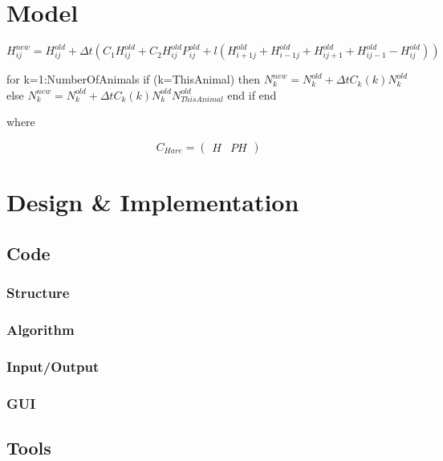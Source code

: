 \documentclass[12pt]{report}
\begin{document}
\chapter{Model} %

$H_{ij}^{new}=H_{ij}^{old} + {\Delta}t(C_{1}H_{ij}^{old}+C_{2}H_{ij}^{old}P_{ij}^{old} + l(H_{i+1j}^{old} + H_{i-1j}^{old} + H_{ij+1}^{old} + H_{ij-1}^{old}-H_{ij}^{old}))$


\vspace{30 mm}

\noindent for k=1:NumberOfAnimals\newline{}
if (k=ThisAnimal) then\newline{}
$N_{k}^{new}=N_{k}^{old} + {\Delta}tC_{k}(k)N_{k}^{old}$\newline{}
else\newline{}
$N_{k}^{new}=N_{k}^{old} + {\Delta}tC_{k}(k)N_{k}^{old}N_{ThisAnimal}^{old}$\newline{}
end if\newline{}
end

where

\[ C_{Hare} = \left( \begin{array}{cc}
H & PH \end{array} \right)\] 

\chapter{Design \& Implementation}
   \section{Code}
      \subsection{Structure} %
      \subsection{Algorithm} %
      \subsection{Input/Output} %
      \subsection{GUI} %
   
   \section{Tools}
\end{document}
